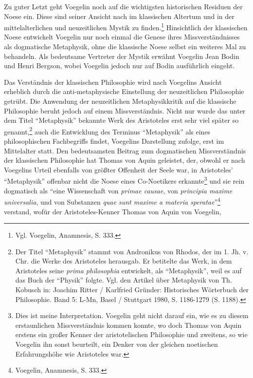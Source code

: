 Zu guter Letzt geht Voegelin noch auf die wichtigsten historischen Residuen
der Noese ein. Diese sind seiner Ansicht nach im klassischen Altertum und in
der mittelalterlichen und neuzeitlichen Mystik zu finden.\footnote{Vgl.
  Voegelin, Anamnesis, S. 333.} Hinsichtlich der klassischen Noese entwickelt
Voegelin nur noch einmal die Genese ihres Missverständnisses als dogmatische
Metaphysik, ohne die klassische Noese selbst ein weiteres Mal zu behandeln.
Als bedeutsame Vertreter der Mystik erwähnt Voegelin Jean Bodin und Henri
Bergson, wobei Voegelin jedoch nur auf Bodin ausführlich eingeht.

Das Verständnis der klassischen Philosophie wird nach Voegelins Ansicht
erheblich durch die anti-metaphysische Einstellung der neuzeitlichen
Philosophie getrübt. Die Anwendung der neuzeitlichen Metaphysikkritik auf die
klassische Philosophie beruht jedoch auf einem Missverständnis.  Nicht nur
wurde das unter dem Titel "`Metaphysik"' bekannte Werk des Aristoteles erst
sehr viel später so genannt,\footnote{Der Titel "`Metaphysik"' stammt von
  Andronikus von Rhodos, der im 1. Jh. v. Chr.  die Werke des Aristoteles
  herausgab. Er betitelte das Werk, in dem Aristoteles seine {\em prima
philosophia}   entwickelt, als "`Metaphysik"', weil es auf das Buch der
"`Physik"' folgte.
  Vgl. den Artikel über Metaphysik von Th. Kobusch in: Joachim Ritter /
  Karlfried Gründer: Historisches Wörterbuch der Philosophie. Band 5: L-Mn,
  Basel / Stuttgart 1980, S. 1186-1279 (S. 1188).}  auch die Entwicklung des
Terminus "`Metaphysik"' als eines philosophischen Fachbegriffs findet,
Voegelins Darstellung zufolge, erst im Mittelalter statt. Den bedeutsamsten
Beitrag zum dogmatischen Missverständnis der klassischen Philosophie hat
Thomas von Aquin geleistet, der, obwohl er nach Voegelins Urteil ebenfalls von
größter Offenheit der Seele war, in Aristoteles' "`Metaphysik"' offenbar nicht
die Noese eines Co-Noetikers erkannte\footnote{Dies ist meine Interpretation.
  Voegelin geht nicht darauf ein, wie es zu diesem erstaunlichen
  Missverständnis kommen konnte, wo doch Thomas von Aquin erstens ein großer
  Kenner der aristotelischen Philosophie und zweitens, so wie Voegelin ihn
  sonst beurteilt, ein Denker von der gleichen noetischen Erfahrungshöhe wie
  Aristoteles war.} und sie rein dogmatisch als "`eine Wissenschaft von {\it
  primae causae}, von {\it principia maxime universalia}, und von Substanzen
{\it quae sunt maxime a materia speratae}"'\footnote{Voegelin, Anamnesis, S.
  333.} verstand, wofür der Aristoteles-Kenner Thomas von Aquin von Voegelin,
